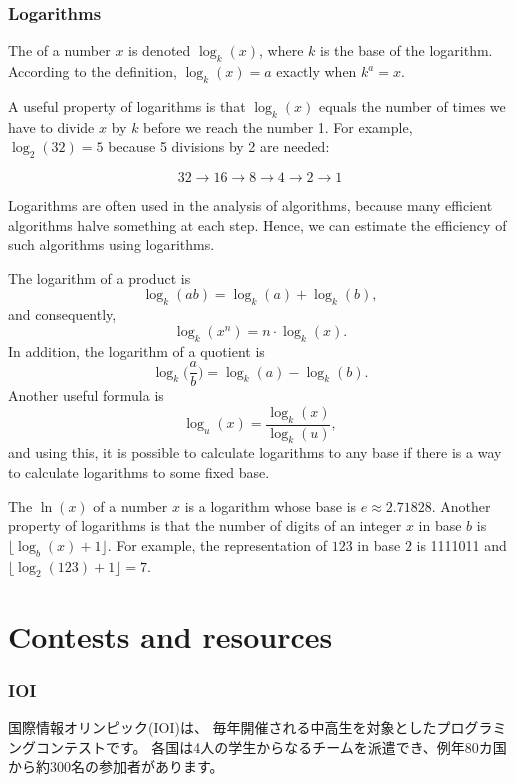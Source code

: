 \subsubsection{Logarithms}


The  of a number $x$
is denoted $\log_k(x)$, where $k$ is the base
of the logarithm.
According to the definition,
$\log_k(x)=a$ exactly when $k^a=x$.

A useful property of logarithms is
that $\log_k(x)$ equals the number of times
we have to divide $x$ by $k$ before we reach
the number 1.
For example, $\log_2(32)=5$
because 5 divisions by 2 are needed:

\[32 \rightarrow 16 \rightarrow 8 \rightarrow 4 \rightarrow 2 \rightarrow 1 \]

Logarithms are often used in the analysis of
algorithms, because many efficient algorithms
halve something at each step.
Hence, we can estimate the efficiency of such algorithms
using logarithms.

The logarithm of a product is
\[\log_k(ab) = \log_k(a)+\log_k(b),\]
and consequently,
\[\log_k(x^n) = n \cdot \log_k(x).\]
In addition, the logarithm of a quotient is
\[\log_k\Big(\frac{a}{b}\Big) = \log_k(a)-\log_k(b).\]
Another useful formula is
\[\log_u(x) = \frac{\log_k(x)}{\log_k(u)},\]
and using this, it is possible to calculate
logarithms to any base if there is a way to
calculate logarithms to some fixed base.


The  $\ln(x)$ of a number $x$
is a logarithm whose base is $e \approx 2.71828$.
Another property of logarithms is that
the number of digits of an integer $x$ in base $b$ is
$\lfloor \log_b(x)+1 \rfloor$.
For example, the representation of
$123$ in base $2$ is 1111011 and
$\lfloor \log_2(123)+1 \rfloor = 7$.

\section{Contests and resources}

\subsubsection{IOI}

国際情報オリンピック(IOI)は、
毎年開催される中高生を対象としたプログラミングコンテストです。
各国は4人の学生からなるチームを派遣でき、例年80カ国から約300名の参加者があります。

